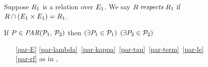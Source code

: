 \begin{figure}
  \raggedright
  \noindent
  Suppose $R_1$ is a relation over $E_1$.  %
  We say $\aRel \rextendsdef{\aRel_1}{}$ %
  if
  $R\cap(E_1\times E_1) = R_1$.
  \medskip
  

  \noindent
  If $\aPS \in \sLPAR{\aPSS_1}{\aPSS_2}$ then  
  $(\exists P_1\in\mathcal{P}_1)$ $(\exists P_2\in\mathcal{P}_2)$
  \begin{multicols}{2}
    \begin{enumerate}[topsep=0pt,label=(\textsc{p}\arabic*),ref=\textsc{p}\arabic*]
    \item[\eqref{par-E}]
      \eqref{par-lambda}\,
      \eqref{par-kappa}\,
      \eqref{par-tau}\, 
      \eqref{par-term}\, 
      \eqref{par-le}\,
      \eqref{par-rf}
      as in ,
      \setcounter{enumi}{\value{le}}
    \item[] 
      \begin{enumerate}[leftmargin=0pt]

\end{enumerate}
\end{enumerate}
\end{multicols}
\end{figure}

